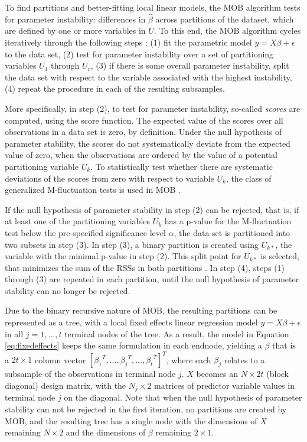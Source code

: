 \documentclass[nobf,man]{apa}
\begin{document}
To find partitions and better-fitting local linear models, the MOB algorithm tests for parameter instability: differences in $\hat{\beta}$ across partitions of the dataset, which are defined by one or more variables in $U$. To this end, the MOB algorithm cycles iteratively through the following steps \cite{ZeilyHoth08}: (1) fit the parametric model $y=X \beta + \epsilon$ to the data set, (2) test for parameter instability over a set of partitioning variables $U_1$ through $U_r$, (3) if there is some overall parameter instability, split the data set with respect to the variable associated with the highest instability, (4) repeat the procedure in each of the resulting subsamples.

More specifically, in step (2), to test for parameter instability, so-called \textit{scores} are computed, using the score function. The expected value of the scores over all observations in a data set is zero, by definition. Under the null hypothesis of parameter stability, the scores do not systematically deviate from the expected value of zero, when the observations are ordered by the value of a potential partitioning variable $U_k$. To statistically test whether there are systematic deviations of the scores from zero with respect to variable $U_k$, the class of generalized M-fluctuation tests is used in MOB \cite{Zeil05,ZeilyHorn07}.  

If the null hypothesis of parameter stability in step (2) can be rejected, that is, if at least one of the partitioning variables $U_{k}$ has a p-value for the M-fluctuation test below the pre-specified significance level $\alpha$, the data set is partitioned into two subsets in step (3). In step (3), a binary partition is created using $U_{k*}$, the variable with the minimal p-value in step (2). This split point for $U_{k*}$ is selected, that minimizes the sum of the RSSs in both partitions \cite{ZeilyHoth08}. In step (4), steps (1) through (3) are repeated in each partition, until the null hypothesis of parameter stability can no longer be rejected.

Due to the binary recursive nature of MOB, the resulting partitions can be represented as a tree, with a local fixed effects linear regression model $y = X \beta + \epsilon$ in all $j = 1,...,t$ terminal nodes of the tree. As a result, the model in Equation \ref{eq:fixedeffects} keeps the same formulation in each endnode, yielding a $\beta$ that is a $2t \times 1$ column vector ${\left[ {\beta_1}^T,...,{\beta_j}^T,...,{\beta_t}^T \right]}^T$, where each $\beta_j$ relates to a subsample of the observations in terminal node $j$. $X$ becomes an $N \times 2t$ (block diagonal) design matrix, with the $N_{j} \times 2$ matrices of predictor variable values in terminal node $j$ on the diagonal. Note that when the null hypothesis of parameter stability can not be rejected in the first iteration, no partitions are created by MOB, and the resulting tree has a single node with the dimensions of $X$ remaining $N \times 2$ and the dimensions of $\beta$ remaining $2 \times 1$.
\end{document}
